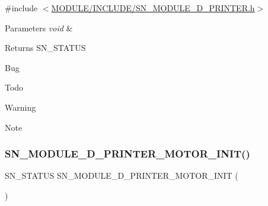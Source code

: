 {\ttfamily \#include $<$\hyperlink{SN__MODULE__3D__PRINTER_8h}{M\+O\+D\+U\+L\+E/\+I\+N\+C\+L\+U\+D\+E/\+S\+N\+\_\+\+M\+O\+D\+U\+L\+E\+\_\+D\+\_\+\+P\+R\+I\+N\+T\+E\+R.\+h}$>$}


\begin{DoxyParams}{Parameters}
{\em void} & \\
\hline
\end{DoxyParams}
\begin{DoxyReturn}{Returns}
S\+N\+\_\+\+S\+T\+A\+T\+US 
\end{DoxyReturn}
\begin{DoxyRefDesc}{Bug}
\item[\hyperlink{bug__bug000002}{Bug}]\end{DoxyRefDesc}
\begin{DoxyRefDesc}{Todo}
\item[\hyperlink{todo__todo000002}{Todo}]\end{DoxyRefDesc}
\begin{DoxyWarning}{Warning}

\end{DoxyWarning}
\begin{DoxyNote}{Note}

\end{DoxyNote}
\mbox{\label{group__PRINTER_gafc569784fa8758bec7c2f90b1a7f1404}} 
\subsubsection{\texorpdfstring{S\+N\+\_\+\+M\+O\+D\+U\+L\+E\+\_\+D\+\_\+\+P\+R\+I\+N\+T\+E\+R\+\_\+\+M\+O\+T\+O\+R\+\_\+\+I\+N\+I\+T()}{SN\_MODULE\_3D\_PRINTER\_MOTOR\_INIT()}}
{\footnotesize\ttfamily S\+N\+\_\+\+S\+T\+A\+T\+US S\+N\+\_\+\+M\+O\+D\+U\+L\+E\+\_\+D\+\_\+\+P\+R\+I\+N\+T\+E\+R\+\_\+\+M\+O\+T\+O\+R\+\_\+\+I\+N\+IT (\begin{DoxyParamCaption}\item[{void}]{ }\end{DoxyParamCaption})}




